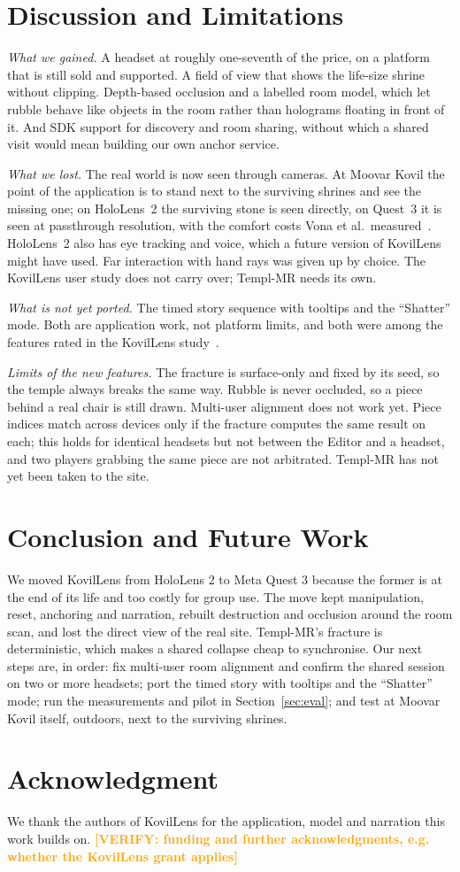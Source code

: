 \documentclass[conference]{IEEEtran}
\newcommand{\VERIFY}[1]{\textcolor{orange}{\textbf{[VERIFY#1]}}}
\begin{document}
\section{Discussion and Limitations}\label{sec:discussion}
\textit{What we gained.} A headset at roughly one-seventh of the price, on a platform that is still sold and supported. A field of view that shows the life-size shrine without clipping. Depth-based occlusion and a labelled room model, which let rubble behave like objects in the room rather than holograms floating in front of it. And SDK support for discovery and room sharing, without which a shared visit would mean building our own anchor service.

\textit{What we lost.} The real world is now seen through cameras. At Moovar Kovil the point of the application is to stand next to the surviving shrines and see the missing one; on HoloLens~2 the surviving stone is seen directly, on Quest~3 it is seen at passthrough resolution, with the comfort costs Vona et al.\ measured~\cite{vona2025}. HoloLens~2 also has eye tracking and voice, which a future version of KovilLens might have used. Far interaction with hand rays was given up by choice. The KovilLens user study does not carry over; Templ-MR needs its own.

\textit{What is not yet ported.} The timed story sequence with tooltips and the ``Shatter'' mode. Both are application work, not platform limits, and both were among the features rated in the KovilLens study~\cite{kovillens2025}.

\textit{Limits of the new features.} The fracture is surface-only and fixed by its seed, so the temple always breaks the same way. Rubble is never occluded, so a piece behind a real chair is still drawn. Multi-user alignment does not work yet. Piece indices match across devices only if the fracture computes the same result on each; this holds for identical headsets but not between the Editor and a headset, and two players grabbing the same piece are not arbitrated. Templ-MR has not yet been taken to the site.

\section{Conclusion and Future Work}
We moved KovilLens from HoloLens 2 to Meta Quest 3 because the former is at the end of its life and too costly for group use. The move kept manipulation, reset, anchoring and narration, rebuilt destruction and occlusion around the room scan, and lost the direct view of the real site. Templ-MR's fracture is deterministic, which makes a shared collapse cheap to synchronise. Our next steps are, in order: fix multi-user room alignment and confirm the shared session on two or more headsets; port the timed story with tooltips and the ``Shatter'' mode; run the measurements and pilot in Section~\ref{sec:eval}; and test at Moovar Kovil itself, outdoors, next to the surviving shrines.

\section*{Acknowledgment}
We thank the authors of KovilLens for the application, model and narration this work builds on. \VERIFY{: funding and further acknowledgments, e.g. whether the KovilLens grant applies}



\end{document}
